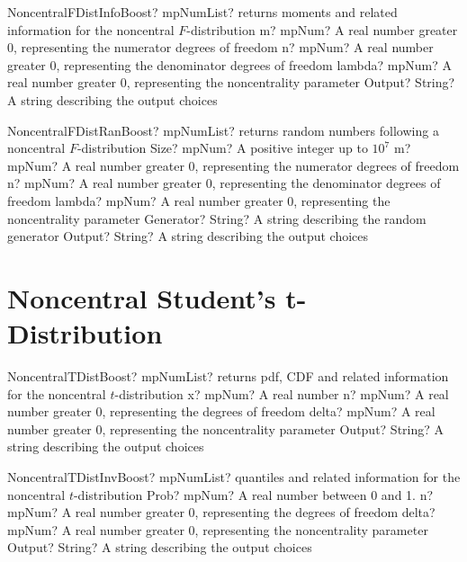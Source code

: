 \documentclass[12pt,a4paper,openany]{book}
\begin{document}
\begin{mpFunctionsExtract}
\mpFunctionFour
{NoncentralFDistInfoBoost? mpNumList? returns moments and related information for the noncentral $F$-distribution}
{m? mpNum? A real number greater 0, representing the numerator  degrees of freedom}
{n? mpNum? A real number greater 0, representing the denominator degrees of freedom}
{lambda? mpNum? A real number greater 0, representing the noncentrality parameter}
{Output? String? A string describing the output choices}
\end{mpFunctionsExtract}

\begin{mpFunctionsExtract}
\mpFunctionSix
{NoncentralFDistRanBoost? mpNumList? returns random numbers following a noncentral $F$-distribution}
{Size? mpNum? A positive integer up to $10^7$}
{m? mpNum? A real number greater 0, representing the numerator  degrees of freedom}
{n? mpNum? A real number greater 0, representing the denominator degrees of freedom}
{lambda? mpNum? A real number greater 0, representing the noncentrality parameter}
{Generator? String? A string describing the random generator}
{Output? String? A string describing the output choices}
\end{mpFunctionsExtract}

\section{Noncentral Student's t-Distribution}

\begin{mpFunctionsExtract}
\mpFunctionFour
{NoncentralTDistBoost? mpNumList? returns pdf, CDF and related information for the noncentral $t$-distribution}
{x? mpNum? A real number}
{n? mpNum? A real number greater 0, representing the degrees of freedom}
{delta? mpNum? A real number greater 0, representing the noncentrality parameter}
{Output? String? A string describing the output choices}
\end{mpFunctionsExtract}

\begin{mpFunctionsExtract}
\mpFunctionFour
{NoncentralTDistInvBoost? mpNumList? quantiles and related information for the  noncentral $t$-distribution}
{Prob? mpNum? A real number between 0 and 1.}
{n? mpNum? A real number greater 0, representing the degrees of freedom}
{delta? mpNum? A real number greater 0, representing the noncentrality parameter}
{Output? String? A string describing the output choices}
\end{mpFunctionsExtract}
\end{document}

